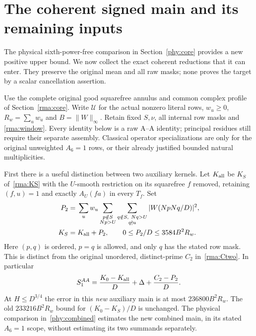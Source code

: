 \section{The coherent signed main and its remaining inputs}\label{cmr:core}
The physical sixth-power-free comparison in Section~\ref{phy:core}
provides a new positive upper bound. We now collect the exact coherent
reductions that it can enter. They preserve the original mean and all
raw masks; none proves the target by a scalar cancellation assertion.

Use the complete original good squarefree annulus and common complex
profile of Section~\ref{rma:core}. Write $\mathcal U$ for the actual
nonzero literal rows, $w_u\ge0$, $R_w=\sum_u w_u$ and
$B=\|W\|_\infty$. Retain fixed $S,\nu$, all internal row masks and
\eqref{rma:window}. Every identity below is a raw A--A identity;
principal residues still require their separate assembly. Classical
operator specializations are only for the original unweighted
$A_6=1$ rows, or their already justified bounded natural multiplicities.

First there is a useful distinction between two auxiliary kernels.
Let $K_{\rm all}$ be $K_S$ of~\eqref{rma:KS} with the $U$-smooth
restriction on its squarefree $f$ removed, retaining $(f,u)=1$ and
exactly $A_U(fa)$ in every $T_f$. Set
\begin{equation}\label{cmr:Ptwo}
 \begin{split}
 P_2={}&\sum_u w_u\sum_{\substack{p\notin S\\Np>U}}
       \sum_{\substack{q\notin S,\ Nq>U\\q\nmid u}}
          |W(NpNq/D)|^2,\\
 K_S={}&K_{\rm all}+P_2,\qquad
 0\le P_2/D\le3584B^2R_w.
 \end{split}
\end{equation}
Here $(p,q)$ is ordered, $p=q$ is allowed, and only $q$ has the
stated row mask. This is distinct from the original unordered,
distinct-prime $C_2$ in~\eqref{rma:Ctwo}. In particular
\begin{equation}\label{cmr:auxexact}
 S_1^{AA}=\frac{K_0-K_{\rm all}}D+\Delta+\frac{C_2-P_2}D.
\end{equation}
At $H\le D^{3/4}$ the error in this \emph{new} auxiliary main is
at most $236800B^2R_w$. The old $233216B^2R_w$ bound for
$(K_0-K_S)/D$ is unchanged. The physical comparison
in~\eqref{phy:combined} estimates the new combined main, in its stated
$A_6=1$ scope, without estimating its two summands separately.

